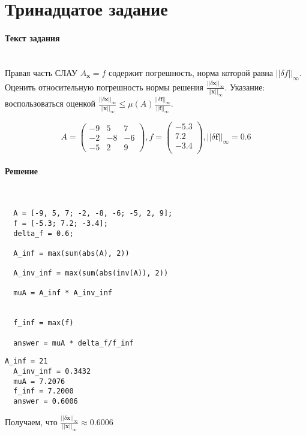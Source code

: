 \section{Тринадцатое задание}
\paragraph{Текст задания} ~\\
Правая часть СЛАУ $A_{\textbf{x}} = f$ содержит погрешность, норма которой равна $||\delta f||_{\infty}$. Оценить относительную погрешность нормы решения $\frac{||\delta \textbf{x}||_{\infty}}{||\textbf{x}||_{\infty}}$. Указание: воспользоваться оценкой $\frac{|| \delta \textbf{x}||_{\infty}}{||\textbf{x}||_{\infty}} \leq \mu(A) \frac{||\delta \textbf{f}||_{\infty}}{||\textbf{f}||_{\infty}}$.

\[
  A =
  \begin{pmatrix}
    -9 & 5 & 7\\
    -2 & -8& -6\\
    -5 & 2 & 9
  \end{pmatrix}
  , f =
  \begin{pmatrix}
    -5.3\\
    7.2\\
    -3.4\\
  \end{pmatrix}
  , ||\delta \textbf{f}||_{\infty} = 0.6
\]

\paragraph{Решение} ~\\
\begin{lstlisting}
  A = [-9, 5, 7; -2, -8, -6; -5, 2, 9];
  f = [-5.3; 7.2; -3.4];
  delta_f = 0.6;

  A_inf = max(sum(abs(A), 2))

  A_inv_inf = max(sum(abs(inv(A)), 2))

  muA = A_inf * A_inv_inf


  f_inf = max(f)

  answer = muA * delta_f/f_inf
\end{lstlisting}
\begin{lstlisting}[backgroundcolor=\color{cyan}]
  A_inf = 21
  A_inv_inf = 0.3432
  muA = 7.2076
  f_inf = 7.2000
  answer = 0.6006
\end{lstlisting}
Получаем, что $\frac{||\delta \textbf{x}||_{\infty}}{||\textbf{x}||_{\infty}} \approx 0.6006$
